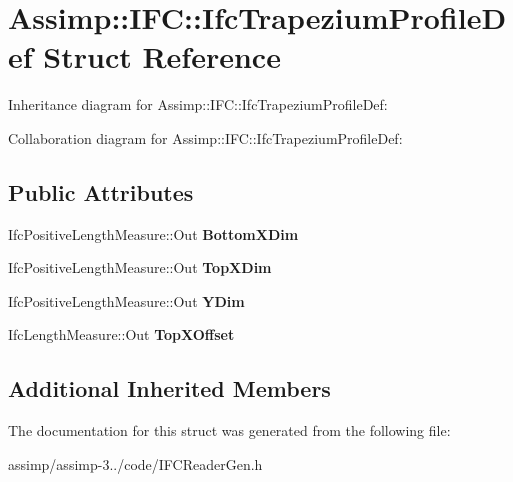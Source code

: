 \hypertarget{struct_assimp_1_1_i_f_c_1_1_ifc_trapezium_profile_def}{\section{Assimp\+:\+:I\+F\+C\+:\+:Ifc\+Trapezium\+Profile\+Def Struct Reference}
\label{struct_assimp_1_1_i_f_c_1_1_ifc_trapezium_profile_def}
}


Inheritance diagram for Assimp\+:\+:I\+F\+C\+:\+:Ifc\+Trapezium\+Profile\+Def\+:


Collaboration diagram for Assimp\+:\+:I\+F\+C\+:\+:Ifc\+Trapezium\+Profile\+Def\+:
\subsection*{Public Attributes}
\begin{DoxyCompactItemize}
\item 
\hypertarget{struct_assimp_1_1_i_f_c_1_1_ifc_trapezium_profile_def_a4910ecc1a8858aa3a982e6a8b346e930}{Ifc\+Positive\+Length\+Measure\+::\+Out {\bfseries Bottom\+X\+Dim}}\label{struct_assimp_1_1_i_f_c_1_1_ifc_trapezium_profile_def_a4910ecc1a8858aa3a982e6a8b346e930}

\item 
\hypertarget{struct_assimp_1_1_i_f_c_1_1_ifc_trapezium_profile_def_a8daeb36f21de84c9eeed92b047497a85}{Ifc\+Positive\+Length\+Measure\+::\+Out {\bfseries Top\+X\+Dim}}\label{struct_assimp_1_1_i_f_c_1_1_ifc_trapezium_profile_def_a8daeb36f21de84c9eeed92b047497a85}

\item 
\hypertarget{struct_assimp_1_1_i_f_c_1_1_ifc_trapezium_profile_def_ad65ca5dc6ec19dc5ee74738c45ec02eb}{Ifc\+Positive\+Length\+Measure\+::\+Out {\bfseries Y\+Dim}}\label{struct_assimp_1_1_i_f_c_1_1_ifc_trapezium_profile_def_ad65ca5dc6ec19dc5ee74738c45ec02eb}

\item 
\hypertarget{struct_assimp_1_1_i_f_c_1_1_ifc_trapezium_profile_def_a87a6c9c7946d8173f417837581a42a7c}{Ifc\+Length\+Measure\+::\+Out {\bfseries Top\+X\+Offset}}\label{struct_assimp_1_1_i_f_c_1_1_ifc_trapezium_profile_def_a87a6c9c7946d8173f417837581a42a7c}

\end{DoxyCompactItemize}
\subsection*{Additional Inherited Members}


The documentation for this struct was generated from the following file\+:\begin{DoxyCompactItemize}
\item 
assimp/assimp-\/3../code/I\+F\+C\+Reader\+Gen.\+h\end{DoxyCompactItemize}
